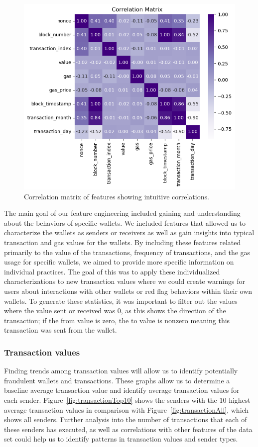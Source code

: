 \documentclass[sigconf]{acmart}
\begin{document}
\begin{figure}[H]
    \centering
    \includegraphics[width=0.8\linewidth]{M4-correlation-matrix.png}
    \caption{Correlation matrix of features showing intuitive correlations.}
    \label{fig:m4CorrelationMatrix}
\end{figure}

The main goal of our feature engineering included gaining and understanding about the behaviors of specific wallets. We included features that allowed us to characterize the wallets as senders or receivers as well as gain insights into typical transaction and gas values for the wallets. By including these features related primarily to the value of the transactions, frequency of transactions, and the gas usage for specific wallets, we aimed to provide more specific information on individual practices. The goal of this was to apply these individualized characterizations to new transaction values where we could create warnings for users about interactions with other wallets or red flag behaviors within their own wallets. To generate these statistics, it was important to filter out the values where the value sent or received was 0, as this shows the direction of the transaction; if the from value is zero, the to value is nonzero meaning this transaction was sent from the wallet. 


\subsubsection{Transaction values}
Finding trends among transaction values will allow us to identify potentially fraudulent wallets and transactions. These graphs allow us to determine a baseline average transaction value and identify average transaction values for each sender. Figure~\ref{fig:transactionTop10} shows the senders with the 10 highest average transaction values in comparison with Figure~\ref{fig:transactionAll}, which shows all senders. Further analysis into the number of transactions that each of these senders has executed, as well as correlations with other features of the data set could help us to identify patterns in transaction values and sender types.
\end{document}
